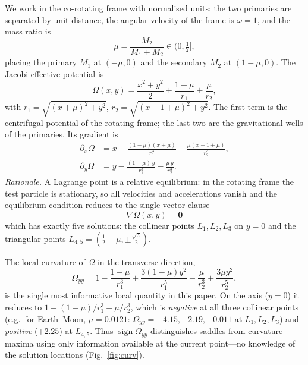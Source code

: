 \documentclass[10pt,twocolumn]{article}
\begin{document}
We work in the co-rotating frame with normalised units: the two primaries are
separated by unit distance, the angular velocity of the frame is
$\omega=1$, and the mass ratio is
\begin{equation}
  \mu=\frac{M_2}{M_1+M_2}\in(0,\tfrac12],
\end{equation}
placing the primary $M_1$ at $(-\mu,0)$ and the secondary $M_2$ at $(1-\mu,0)$.
The Jacobi effective potential is
\begin{equation}
  \Omega(x,y)=\frac{x^2+y^2}{2}+\frac{1-\mu}{r_1}+\frac{\mu}{r_2},
  \label{eq:omega}
\end{equation}
with $r_1=\sqrt{(x+\mu)^2+y^2}$, $r_2=\sqrt{(x-1+\mu)^2+y^2}$. The first term is
the centrifugal potential of the rotating frame; the last two are the
gravitational wells of the primaries. Its gradient is
\begin{align}
  \partial_x\Omega &= x-\frac{(1-\mu)(x+\mu)}{r_1^3}-\frac{\mu(x-1+\mu)}{r_2^3},
  \label{eq:gx}\\
  \partial_y\Omega &= y-\frac{(1-\mu)\,y}{r_1^3}-\frac{\mu\,y}{r_2^3}.
  \label{eq:gy}
\end{align}
\emph{Rationale.} A Lagrange point is a relative equilibrium: in the rotating
frame the test particle is stationary, so all velocities and accelerations
vanish and the equilibrium condition reduces to the single vector clause
\begin{equation}
  \boxed{\;\nabla\Omega(x,y)=\mathbf 0\;}
  \label{eq:clause}
\end{equation}
which has exactly five solutions: the collinear points $L_1,L_2,L_3$ on $y=0$
and the triangular points $L_{4,5}=(\tfrac12-\mu,\pm\tfrac{\sqrt3}{2})$.

The local curvature of $\Omega$ in the transverse direction,
\begin{equation}
  \Omega_{yy}=1-\frac{1-\mu}{r_1^3}+\frac{3(1-\mu)y^2}{r_1^5}
              -\frac{\mu}{r_2^3}+\frac{3\mu y^2}{r_2^5},
  \label{eq:oyy}
\end{equation}
is the single most informative local quantity in this paper. On the axis
($y=0$) it reduces to $1-(1-\mu)/r_1^3-\mu/r_2^3$, which is \emph{negative} at
all three collinear points (e.g.\ for Earth--Moon, $\mu=0.0121$:
$\Omega_{yy}=-4.15,-2.19,-0.011$ at $L_1,L_2,L_3$) and \emph{positive}
($+2.25$) at $L_{4,5}$. Thus $\operatorname{sign}\Omega_{yy}$ distinguishes
saddles from curvature-maxima using only information available at the current
point---no knowledge of the solution locations
(Fig.~\ref{fig:curv}).
\end{document}
